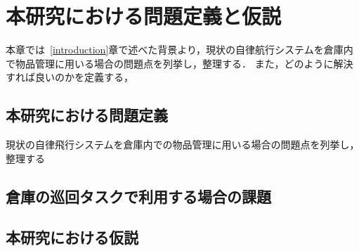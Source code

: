 \chapter{本研究における問題定義と仮説}
\label{issue}
本章では~\ref{introduction}章で述べた背景より，現状の自律航行システムを倉庫内で物品管理に用いる場合の問題点を列挙し，整理する．
また，どのように解決すれば良いのかを定義する，

\section{本研究における問題定義}
現状の自律飛行システムを倉庫内での物品管理に用いる場合の問題点を列挙し，整理する

\section{倉庫の巡回タスクで利用する場合の課題}




\section{本研究における仮説}




